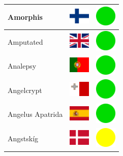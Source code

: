 \documentclass[12pt, a4paper, twoside]{report}
\begin{document}
\begin{center}
\begin{longtable}{|p{5cm}|p{2cm}|p{2cm}|}
 Amorphis                                                   & \includegraphics[width=1cm]{4x3/fi} &   \includegraphics[width=1cm]{likes/y} \\ \hline
 Amputated                                                  & \includegraphics[width=1cm]{4x3/gb} &   \includegraphics[width=1cm]{likes/y} \\ \hline
 Analepsy                                                   & \includegraphics[width=1cm]{4x3/pt} &   \includegraphics[width=1cm]{likes/y} \\ \hline
 Angelcrypt                                                 & \includegraphics[width=1cm]{4x3/mt} &   \includegraphics[width=1cm]{likes/y} \\ \hline
 Angelus Apatrida                                           & \includegraphics[width=1cm]{4x3/es} &   \includegraphics[width=1cm]{likes/y} \\ \hline
 Angstskíg                                                  & \includegraphics[width=1cm]{4x3/dk} &   \includegraphics[width=1cm]{likes/m} \\ \hline

\end{longtable}
\end{center}
\end{document}
